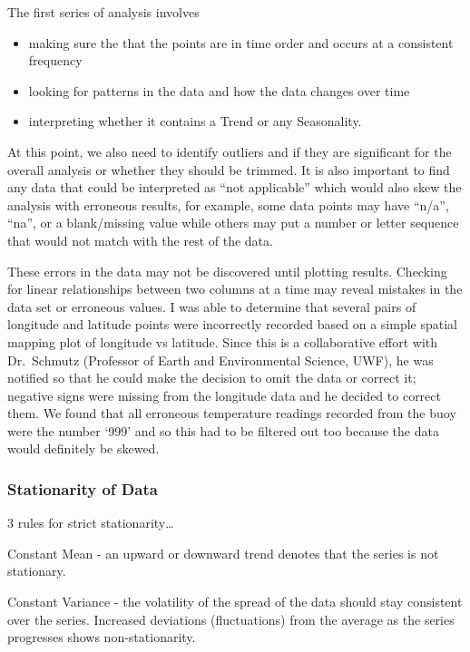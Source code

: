 \documentclass[
  letterpaper,
  DIV=11,
  numbers=noendperiod]{scrartcl}
\providecommand{\tightlist}{%
  \setlength{\itemsep}{0pt}\setlength{\parskip}{0pt}}\usepackage{longtable,booktabs,array}
\begin{document}
The first series of analysis involves

\begin{itemize}
\tightlist
\item
  making sure the that the points are in time order and occurs at a
  consistent frequency
\item
  looking for patterns in the data and how the data changes over time
\item
  interpreting whether it contains a Trend or any Seasonality.
\end{itemize}

At this point, we also need to identify outliers and if they are
significant for the overall analysis or whether they should be trimmed.
It is also important to find any data that could be interpreted as ``not
applicable'' which would also skew the analysis with erroneous results,
for example, some data points may have ``n/a'', ``na'', or a
blank/missing value while others may put a number or letter sequence
that would not match with the rest of the data.

These errors in the data may not be discovered until plotting results.
Checking for linear relationships between two columns at a time may
reveal mistakes in the data set or erroneous values. I was able to
determine that several pairs of longitude and latitude points were
incorrectly recorded based on a simple spatial mapping plot of longitude
vs latitude. Since this is a collaborative effort with Dr.~Schmutz
(Professor of Earth and Environmental Science, UWF), he was notified so
that he could make the decision to omit the data or correct it; negative
signs were missing from the longitude data and he decided to correct
them. We found that all erroneous temperature readings recorded from the
buoy were the number `999' and so this had to be filtered out too
because the data would definitely be skewed.

\subsubsection{Stationarity of Data}\label{stationarity-of-data}

3 rules for strict stationarity\ldots{}

Constant Mean - an upward or downward trend denotes that the series is
not stationary.

Constant Variance - the volatility of the spread of the data should stay
consistent over the series. Increased deviations (fluctuations) from the
average as the series progresses shows non-stationarity.
\end{document}
